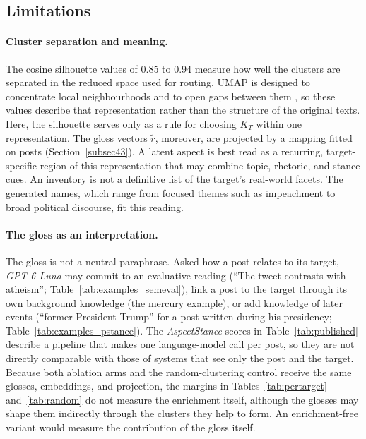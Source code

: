 \documentclass[pdflatex,sn-mathphys-num,iicol]{sn-jnl}%
\begin{document}
\subsection{Limitations}\label{subsec73}

\paragraph{Cluster separation and meaning.} The cosine silhouette values of 0.85 to 0.94 measure how well the clusters are separated in the reduced space used for routing. UMAP is designed to concentrate local neighbourhoods and to open gaps between them \cite{umap-clustering-docs}, so these values describe that representation rather than the structure of the original texts. Here, the silhouette serves only as a rule for choosing \(K_T\) within one representation. The gloss vectors \(\tilde{r}\), moreover, are projected by a mapping fitted on posts (Section~\ref{subsec43}). A latent aspect is best read as a recurring, target-specific region of this representation that may combine topic, rhetoric, and stance cues. An inventory is not a definitive list of the target's real-world facets. The generated names, which range from focused themes such as impeachment to broad political discourse, fit this reading.

\paragraph{The gloss as an interpretation.} The gloss is not a neutral paraphrase. Asked how a post relates to its target, \textit{GPT-6 Luna} may commit to an evaluative reading (``The tweet contrasts with atheism''; Table~\ref{tab:examples_semeval}), link a post to the target through its own background knowledge (the mercury example), or add knowledge of later events (``former President Trump'' for a post written during his presidency; Table~\ref{tab:examples_pstance}). The \textit{AspectStance} scores in Table~\ref{tab:published} describe a pipeline that makes one language-model call per post, so they are not directly comparable with those of systems that see only the post and the target. Because both ablation arms and the random-clustering control receive the same glosses, embeddings, and projection, the margins in Tables~\ref{tab:pertarget} and~\ref{tab:random} do not measure the enrichment itself, although the glosses may shape them indirectly through the clusters they help to form. An enrichment-free variant would measure the contribution of the gloss itself.
\end{document}
